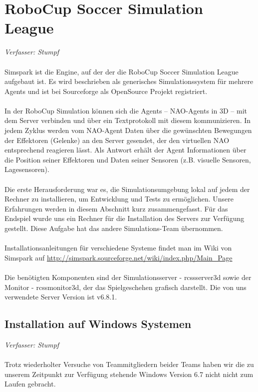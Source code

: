 \documentclass[fontsize=12pt,a4paper,final]{scrartcl}[2003/01/01]
\begin{document}
\section{RoboCup Soccer Simulation League}
\textit{Verfasser: Stumpf}\\
\\
Simspark ist die Engine, auf der der die RoboCup Soccer Simulation League aufgebaut ist. Es wird beschrieben als generisches Simulationssystem für mehrere Agents und ist bei Sourceforge als OpenSource Projekt registriert.\\
\\
In der RoboCup Simulation können sich die Agents -- NAO-Agents in 3D -- mit dem Server verbinden und über ein Textprotokoll mit diesem kommunizieren. In jedem Zyklus werden vom NAO-Agent Daten über die gewünschten Bewegungen der Effektoren (Gelenke) an den Server gesendet, der den virtuellen NAO entsprechend reagieren lässt. Als Antwort erhält der Agent Informationen über die Position seiner Effektoren und Daten seiner Sensoren (z.B. visuelle Sensoren, Lagesensoren).\\
\\
Die erste Herausforderung war es, die Simulationsumgebung lokal auf jedem der Rechner zu installieren, um Entwicklung und Tests zu ermöglichen. Unsere Erfahrungen werden in diesem Abschnitt kurz zusammengefasst. Für das Endspiel wurde uns ein Rechner für die Installation des Servers zur Verfügung gestellt. Diese Aufgabe hat das andere Simulations-Team übernommen.\\
\\
Installationsanleitungen für verschiedene Systeme findet man im Wiki von Simspark auf \href{http://simspark.sourceforge.net/wiki/index.php/Main_Page}{http://simspark.sourceforge.net/wiki/index.php/Main\_Page}\\
\\
Die benötigten Komponenten sind der Simulationsserver - rcssserver3d sowie der Monitor - rcssmonitor3d, der das Spielgeschehen grafisch darstellt. Die von uns verwendete Server Version ist v6.8.1.

\subsection{Installation auf Windows Systemen}
\textit{Verfasser: Stumpf}\\
\\
Trotz wiederholter Versuche von Teammitgliedern beider Teams haben wir die zu unserem Zeitpunkt zur Verfügung stehende Windows Version 6.7 nicht nicht zum Laufen gebracht. 
\end{document}
